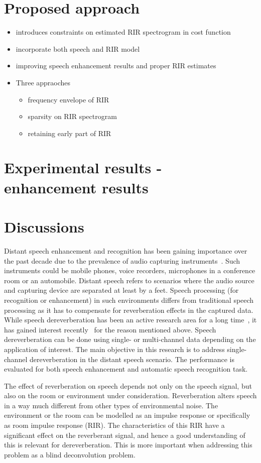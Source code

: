 \section{Proposed approach}
\begin{itemize}
\item introduces constraints on estimated RIR spectrogram in cost function
\item incorporate both speech and RIR model
\item improving speech enhancement results and proper RIR estimates
\item Three appraoches
\begin{itemize}
\item frequency envelope of RIR
\item sparsity on RIR spectrogram
\item retaining early part of RIR
\end{itemize}  
\end{itemize}
\section{Experimental results - enhancement results} 
\section{Discussions} 
\fi

\iffalse
Distant speech enhancement and recognition has been gaining importance over the
past decade due to the prevalence of audio capturing
instruments~\cite{Kumatani2012}. Such
instruments could be mobile phones, voice recorders, microphones in a conference
room or an automobile. Distant speech refers to scenarios where the audio source
and capturing device are separated at least by a feet. Speech processing (for
recognition or enhancement) in such environments differs from traditional speech
processing as it has to compensate for reverberation effects in the captured
data. While speech dereverberation has been an active research area for a long
time~\cite{naylor2010speech}, it has gained interest recently~\cite{reverb2014}
for the reason mentioned above. Speech dereverberation can be done using single-
or multi-channel data depending on the application of interest. The main objective in
this research is to address single-channel dereverberation in the distant speech scenario. The performance is evaluated for both speech enhancement and automatic speech recognition task. 

The effect of reverberation on speech depends not only on the speech signal, but
also on the room or environment under consideration. Reverberation alters speech
in a way much different from other types of environmental noise. The environment
or the room can be modelled as an impulse response or specifically as room
impulse response (RIR). The characteristics of this RIR have a significant
effect on the reverberant signal, and hence a good understanding of this is
relevant for dereverberation. This is more important when addressing this
problem as a blind deconvolution problem. 

